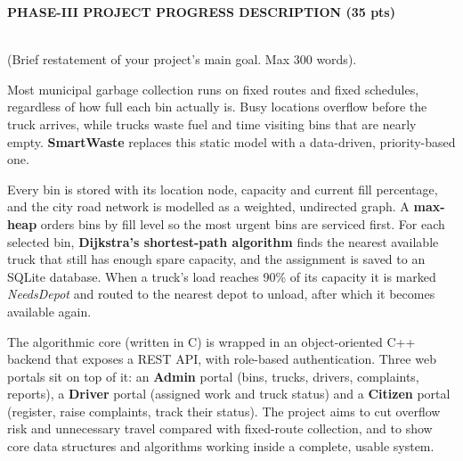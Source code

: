 \documentclass[11pt,a4paper]{article}
\newcommand{\banner}[1]{\vspace{6pt}\noindent\colorbox{banner}{\parbox{\dimexpr\linewidth-2\fboxsep}{\vspace{4pt}\Large\bfseries\color{bannertext}#1\vspace{4pt}}}\vspace{8pt}}
\newcommand{\qhead}[2]{\vspace{8pt}{\color{subhead}\LARGE #1}\\[-1pt]{\color{hint}\small #2}\par\vspace{2pt}}
\begin{document}
\newpage
\banner{PHASE-III PROJECT PROGRESS DESCRIPTION (35 pts)}

\qhead{Project Abstract (2 pts)}{(Brief restatement of your project's main goal. Max 300 words).}
\begin{answer}
Most municipal garbage collection runs on fixed routes and fixed schedules, regardless of how full each bin actually is. Busy locations overflow before the truck arrives, while trucks waste fuel and time visiting bins that are nearly empty. \textbf{SmartWaste} replaces this static model with a data-driven, priority-based one.
\par\medskip
Every bin is stored with its location node, capacity and current fill percentage, and the city road network is modelled as a weighted, undirected graph. A \textbf{max-heap} orders bins by fill level so the most urgent bins are serviced first. For each selected bin, \textbf{Dijkstra's shortest-path algorithm} finds the nearest available truck that still has enough spare capacity, and the assignment is saved to an SQLite database. When a truck's load reaches 90\% of its capacity it is marked \emph{NeedsDepot} and routed to the nearest depot to unload, after which it becomes available again.
\par\medskip
The algorithmic core (written in C) is wrapped in an object-oriented C++ backend that exposes a REST API, with role-based authentication. Three web portals sit on top of it: an \textbf{Admin} portal (bins, trucks, drivers, complaints, reports), a \textbf{Driver} portal (assigned work and truck status) and a \textbf{Citizen} portal (register, raise complaints, track their status). The project aims to cut overflow risk and unnecessary travel compared with fixed-route collection, and to show core data structures and algorithms working inside a complete, usable system.
\end{answer}
\end{document}
